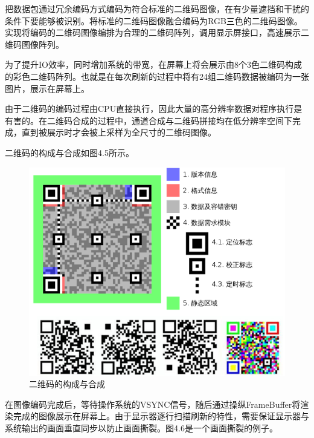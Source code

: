 把数据包通过冗余编码方式编码为符合标准的二维码图像，在有少量遮挡和干扰的条件下要能够被识别。将标准的二维码图像融合编码为RGB三色的二维码图像。实现将编码的二维码图像编排为合理的二维码阵列，调用显示屏接口，高速展示二维码图像阵列。

为了提升IO效率，同时增加系统的带宽，在屏幕上将会展示由8个3色二维码构成的彩色二维码阵列。也就是在每次刷新的过程中将有24组二维码数据被编码为一张图片，展示在屏幕上。

由于二维码的编码过程由CPU直接执行，因此大量的高分辨率数据对程序执行是有害的。在二维码合成的过程中，通道合成与二维码拼接均在低分辨率空间下完成，直到被展示时才会被上采样为全尺寸的二维码图像。

二维码的构成与合成如图4.5所示。

\begin{figure}[!htbp]
\centering
\includegraphics[scale=0.8]{figures/QR_Str.png}
\caption{二维码的构成与合成}
\end{figure}

在图像编码完成后，等待操作系统的VSYNC信号，随后通过操纵FrameBuffer将渲染完成的图像展示在屏幕上。由于显示器逐行扫描刷新的特性，需要保证显示器与系统输出的画面垂直同步以防止画面撕裂。图4.6是一个画面撕裂的例子。

